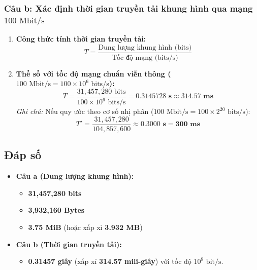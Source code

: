 \documentclass[a4paper]{article}
\numberwithin{figure}{section}
\numberwithin{table}{section}
\begin{document}
\subsubsection*{Câu b: Xác định thời gian truyền tải khung hình qua mạng $100\text{ Mbit/s}$}
\begin{enumerate}
    \item \textbf{Công thức tính thời gian truyền tải:}
    \begin{equation*}
        T = \frac{\text{Dung lượng khung hình (bits)}}{\text{Tốc độ mạng (bits/s)}}
    \end{equation*}
    \item \textbf{Thế số với tốc độ mạng chuẩn viễn thông ($100\text{ Mbit/s} = 100 \times 10^6\text{ bits/s}$):}
    \begin{equation*}
        T = \frac{31{,}457{,}280\text{ bits}}{100 \times 10^6\text{ bits/s}} = \mathbf{0.3145728\text{ s}} \approx \mathbf{314.57\text{ ms}}
    \end{equation*}
    \textit{Ghi chú:} Nếu quy ước theo cơ số nhị phân ($100\text{ Mbit/s} = 100 \times 2^{20}\text{ bits/s}$):
    \begin{equation*}
        T' = \frac{31{,}457{,}280}{104{,}857{,}600} \approx \mathbf{0.3000\text{ s}} = \mathbf{300\text{ ms}}
    \end{equation*}
\end{enumerate}

\subsection{Đáp số}
\begin{answerbox}
\begin{itemize}[leftmargin=1.0cm]
    \item \textbf{Câu a (Dung lượng khung hình):}
    \begin{itemize}
        \item \textbf{31,457,280 bits}
        \item \textbf{3,932,160 Bytes}
        \item \textbf{3.75 MiB} (hoặc xấp xỉ \textbf{3.932 MB})
    \end{itemize}
    \item \textbf{Câu b (Thời gian truyền tải):}
    \begin{itemize}
        \item \textbf{0.31457 giây} (xấp xỉ \textbf{314.57 mili-giây}) với tốc độ $10^8\text{ bit/s}$.
    \end{itemize}
\end{itemize}
\end{answerbox}
\end{document}
